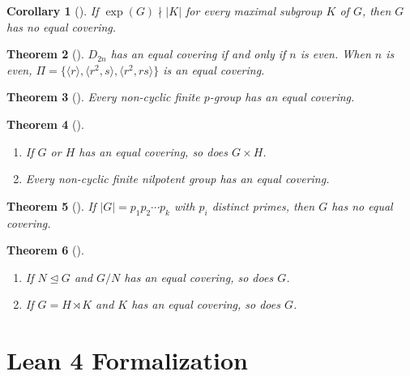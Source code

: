 \documentclass[12pt, a4paper]{article}
\theoremstyle{plain}
\newtheorem{theorem}{Theorem}[section]
\newtheorem{corollary}[theorem]{Corollary}
\theoremstyle{definition}
\DeclareMathOperator{\Exp}{exp}
\newcommand{\norml}{\trianglelefteq}
\newcommand{\Dih}[1]{D_{#1}}
\begin{document}
\begin{corollary}[{\cite[Corollary~1]{velasquez2022}}]
  \label{cor:exp}
  If $\Exp(G) \nmid |K|$ for every maximal subgroup $K$ of $G$, then $G$ has no
  equal covering.
\end{corollary}

\begin{theorem}[{\cite[Theorem~14]{velasquez2022}}]
  \label{thm:dihedral}
  $\Dih{2n}$ has an equal covering if and only if $n$ is even. When $n$ is even,
  $\Pi = \{\langle r \rangle, \langle r^2, s \rangle, \langle r^2, rs \rangle\}$
  is an equal covering.
\end{theorem}

\begin{theorem}[{\cite[Theorem~15]{velasquez2022}}]
  Every non-cyclic finite $p$-group has an equal covering.
\end{theorem}

\begin{theorem}[{\cite[Theorems~16, 17]{velasquez2022}}]
  \label{thm:product}
  \begin{enumerate}[label=\emph{(\roman*)}]
    \item If $G$ or $H$ has an equal covering, so does $G \times H$.
    \item Every non-cyclic finite nilpotent group has an equal covering.
  \end{enumerate}
\end{theorem}

\begin{theorem}[{\cite[Theorem~18]{velasquez2022}}]
  If $|G| = p_1 p_2 \cdots p_k$ with $p_i$ distinct primes, then $G$ has no
  equal covering.
\end{theorem}

\begin{theorem}[{\cite[Theorem~19, Corollary~4]{velasquez2022}}]
  \label{thm:normal}
  \begin{enumerate}[label=\emph{(\roman*)}]
    \item If $N \norml G$ and $G/N$ has an equal covering, so does $G$.
    \item If $G = H \rtimes K$ and $K$ has an equal covering, so does $G$.
  \end{enumerate}
\end{theorem}

\section{Lean 4 Formalization}
\label{sec:lean}
\end{document}
